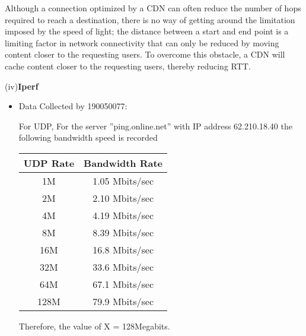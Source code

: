 \documentclass[12pt]{article}
\theoremstyle{remark}
\newcommand{\tbf}[1]{\textbf{#1}}
\begin{document}
\hspace{0.2 in}Although a connection optimized by a CDN can often reduce the number of hops required to reach a destination, there is no way of getting around the limitation imposed by the speed of light; the distance between a start and end point is a limiting factor in network connectivity that can only be reduced by moving content closer to the requesting users. To overcome this obstacle, a CDN will cache content closer to the requesting users, thereby reducing RTT.
\newpage
\centerline{\Large(iv)\tbf{Iperf}}
\normalsize
\begin{itemize}
    \item Data Collected by 190050077:

\begin{table}[H]
    \centering
     \caption{TCP Bandwidth Rates}
\end{table}
For UDP,
For the server ”ping.online.net” with IP address 62.210.18.40 the following bandwidth speed is recorded\\
\begin{table}[H]
    \begin{tabular}{|c| c|}
         \hline
         \textbf{UDP Rate} &  \textbf{Bandwidth Rate}\\
         \hline
         1M & 1.05 Mbits/sec\\
         2M &  2.10 Mbits/sec\\
         4M &  4.19 Mbits/sec\\
         8M & 8.39 Mbits/sec
\\
        16M &      16.8 Mbits/sec\\
        
        32M & 33.6 Mbits/sec
\\
64M & 67.1 Mbits/sec
\\
128M & 79.9 Mbits/sec
\\
\hline
    \end{tabular}%
\end{table}
Therefore, the value of X = 128Megabits.\\


\end{itemize}
\end{document}
